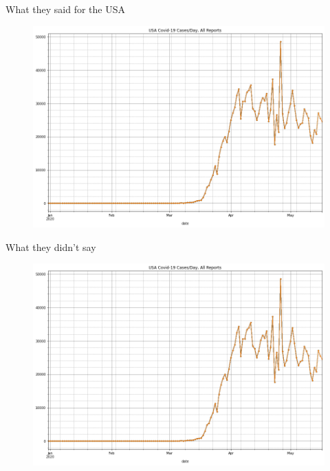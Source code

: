 \documentclass[aspectratio=169]{beamer}
\begin{document}
\begin{frame}{What they said for the USA}
  \begin{figure}
    \centering
    \includegraphics[height=.8\textheight]{../Notebooks/USACasesPerDayRawNoLegend.png}
  \end{figure}
\end{frame}


\begin{frame}{What they didn't say}
  \begin{figure}
    \centering
    \includegraphics[height=.8\textheight]{../Notebooks/USACasesPerDayRawNoLegend.png}
  \end{figure}
\end{frame}
\end{document}
